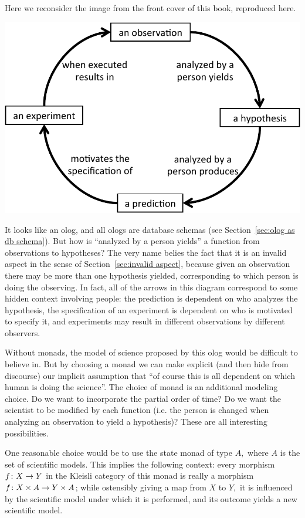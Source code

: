 \documentclass[../main/CT4S-EN-RU]{subfiles}
\begin{document}
\begin{remarkRUS}\label{rem:state monad}
\end{remarkRUS}

\begin{exampleENG}\label{ex:scientific method}
Here we reconsider the image from the front cover of this book, reproduced here.
\begin{center}
\includegraphics[width=.8\textwidth]{ScientificMethod}
\end{center}

It looks like an olog, and all ologs are database schemas (see Section~\ref{sec:olog as db schema}). But how is “analyzed by a person yields” a function from observations to hypotheses? The very name belies the fact that it is an invalid aspect in the sense of Section~\ref{sec:invalid aspect}, because given an observation there may be more than one hypothesis yielded, corresponding to which person is doing the observing. In fact, all of the arrows in this diagram correspond to some hidden context involving people: the prediction is dependent on who analyzes the hypothesis, the specification of an experiment is dependent on who is motivated to specify it, and experiments may result in different observations by different observers. 

Without monads, the model of science proposed by this olog would be difficult to believe in. But by choosing a monad we can make explicit (and then hide from discourse) our implicit assumption that “of course this is all dependent on which human is doing the science”. The choice of monad is an additional modeling choice. Do we want to incorporate the partial order of time? Do we want the scientist to be modified by each function (i.e. the person is changed when analyzing an observation to yield a hypothesis)? These are all interesting possibilities. 

One reasonable choice would be to use the state monad of type $A,$ where $A$ is the set of scientific models. This implies the following context: every morphism $f\colon X\rightarrow Y$ in the Kleisli category of this monad is really a morphism $f\colon X\times A\rightarrow Y\times A$; while ostensibly giving a map from $X$ to $Y,$ it is influenced by the scientific model under which it is performed, and its outcome yields a new scientific model. 


\end{exampleENG}
\end{document}
